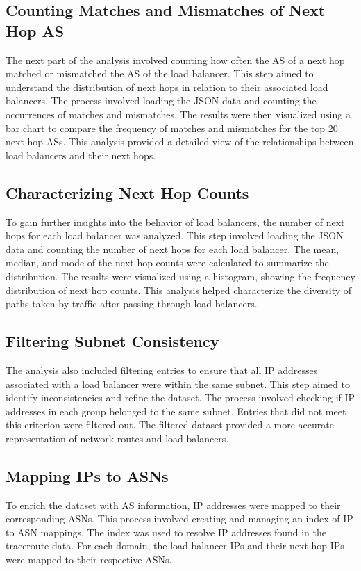 \documentclass[12pt]{cwru_thesis}
\begin{document}
\subsection{Counting Matches and Mismatches of Next Hop AS}
The next part of the analysis involved counting how often the AS of a next hop matched or mismatched the AS of the load balancer. This step aimed to understand the distribution of next hops in relation to their associated load balancers. The process involved loading the JSON data and counting the occurrences of matches and mismatches. The results were then visualized using a bar chart to compare the frequency of matches and mismatches for the top 20 next hop ASs. This analysis provided a detailed view of the relationships between load balancers and their next hops.

\subsection{Characterizing Next Hop Counts}
To gain further insights into the behavior of load balancers, the number of next hops for each load balancer was analyzed. This step involved loading the JSON data and counting the number of next hops for each load balancer. The mean, median, and mode of the next hop counts were calculated to summarize the distribution. The results were visualized using a histogram, showing the frequency distribution of next hop counts. This analysis helped characterize the diversity of paths taken by traffic after passing through load balancers.

\subsection{Filtering Subnet Consistency}
The analysis also included filtering entries to ensure that all IP addresses associated with a load balancer were within the same subnet. This step aimed to identify inconsistencies and refine the dataset. The process involved checking if IP addresses in each group belonged to the same subnet. Entries that did not meet this criterion were filtered out. The filtered dataset provided a more accurate representation of network routes and load balancers.

\subsection{Mapping IPs to ASNs}
To enrich the dataset with AS information, IP addresses were mapped to their corresponding ASNs. This process involved creating and managing an index of IP to ASN mappings. The index was used to resolve IP addresses found in the traceroute data. For each domain, the load balancer IPs and their next hop IPs were mapped to their respective ASNs. 
\end{document}

